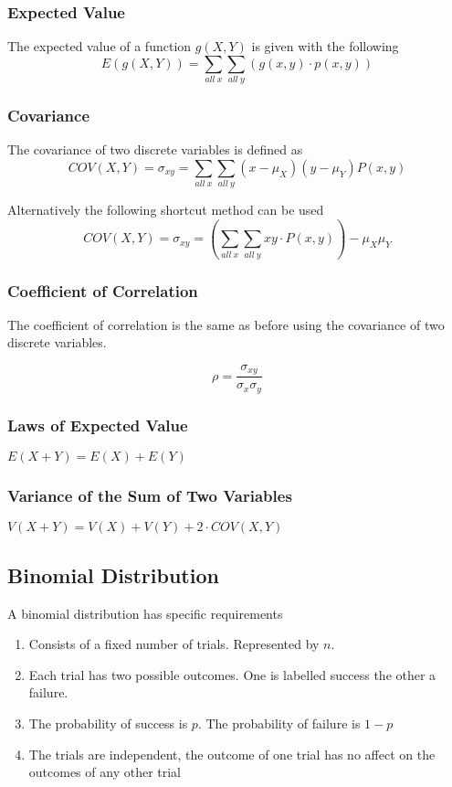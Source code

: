 \documentclass{article}
\begin{document}
\subsubsection{Expected Value }
The expected value of a function $g(X,Y)$ is given with the following
\begin{equation}
E(g(X,Y))= \sum\limits_{all\:x}\sum\limits_{all\:y}(g(x,y) \cdot p(x,y))
\end{equation}

\subsubsection{Covariance}
The covariance of two discrete variables is defined as
\begin{equation}
COV(X,Y) = \sigma_{xy} = \sum\limits_{all\:x}\sum\limits_{all\:y}(x-\mu_X)(y - \mu_Y)P(x,y)
\end{equation}

Alternatively the following shortcut method can be used
\begin{equation}
COV(X,Y) = \sigma_{xy} = \left(\sum\limits_{all\:x}\sum\limits_{all\:y}xy \cdot P(x,y)\right) - \mu_X\mu_Y
\end{equation}

\subsubsection{Coefficient of Correlation}
The coefficient of correlation is the same as before using the covariance of two discrete variables.

\begin{equation}
\rho = \frac{\sigma_{xy}}{\sigma_x \sigma_y}
\end{equation}

\subsubsection{Laws of Expected Value}

$E(X + Y) = E(X) + E(Y)$

\subsubsection{Variance of the Sum of Two Variables}

$V(X + Y) = V(X) + V(Y) + 2 \cdot COV(X,Y)$

\subsection{Binomial Distribution}
A binomial distribution has specific requirements
\begin{enumerate}
\item Consists of a fixed number of trials. Represented by $n$.
\item Each trial has two possible outcomes. One is labelled success the other a failure.
\item The probability of success is $p$. The probability of failure is $1-p$
\item The trials are independent, the outcome of one trial has no affect on the outcomes of any other trial
\end{enumerate}
\end{document}
